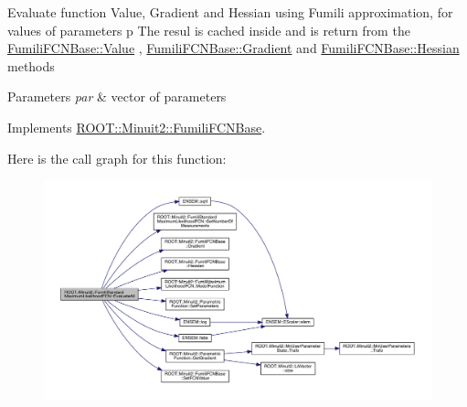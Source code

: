 Evaluate function Value, Gradient and Hessian using Fumili approximation, for values of parameters p The resul is cached inside and is return from the \mbox{\hyperlink{classROOT_1_1Minuit2_1_1FumiliFCNBase_a221dacee0ccde747a271a0cecd759f98}{Fumili\+F\+C\+N\+Base\+::\+Value}} , \mbox{\hyperlink{classROOT_1_1Minuit2_1_1FumiliFCNBase_ad226939ea2e83f754b5a6afc30876d3e}{Fumili\+F\+C\+N\+Base\+::\+Gradient}} and \mbox{\hyperlink{classROOT_1_1Minuit2_1_1FumiliFCNBase_ade134d8c6613393e942ef98d445db376}{Fumili\+F\+C\+N\+Base\+::\+Hessian}} methods


\begin{DoxyParams}{Parameters}
{\em par} & vector of parameters \\
\hline
\end{DoxyParams}


Implements \mbox{\hyperlink{classROOT_1_1Minuit2_1_1FumiliFCNBase_a0741bb4a7405cc33ab60583472a189cb}{R\+O\+O\+T\+::\+Minuit2\+::\+Fumili\+F\+C\+N\+Base}}.

Here is the call graph for this function\+:
\nopagebreak
\begin{figure}[H]
\begin{center}
\leavevmode
\includegraphics[width=350pt]{dd/d40/classROOT_1_1Minuit2_1_1FumiliStandardMaximumLikelihoodFCN_a1faea776f7da3c238e522748b573caab_cgraph}
\end{center}
\end{figure}
\mbox{\label{classROOT_1_1Minuit2_1_1FumiliStandardMaximumLikelihoodFCN_a37e72fc87092e5699066098fa5a31235}} 
